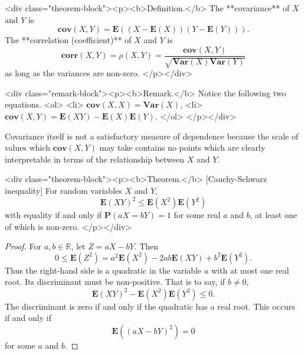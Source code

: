 <div class="theorem-block"><p><b>Definition.</b> 
The **covariance** of $X$ and $Y$ is
$$\begin{equation}
    \mathbf{cov}(X,Y) = \mathbf{E}\left( (X-\mathbf{E}(X))(Y-\mathbf{E}(Y)) \right).
\end{equation}$$
The **correlation (coefficient)** of $X$ and $Y$ is 
$$\begin{equation}
\mathbf{corr}(X, Y) = \rho(X,Y) = \frac{\mathbf{cov}(X,Y)}{\sqrt{\mathbf{Var}(X)\mathbf{Var}(Y)}}
\end{equation}$$
as long as the variances are non-zero. 
</p></div>

<div class="remark-block"><p><b>Remark.</b> 
Notice the following two equations.
<ol>
    <li> $\mathbf{cov}(X,X) = \mathbf{Var}(X)$,
    <li> $\mathbf{cov}(X,Y) = \mathbf{E}(XY) - \mathbf{E}(X)\mathbf{E}(Y)$.
</ol>
</p></div>

Covariance itself is not a satisfactory measure of dependence because the scale of values which $\mathbf{cov}(X, Y)$ may take contains no points which are clearly interpretable in terms of the relationship between $X$ and $Y$.

<div class="theorem-block"><p><b>Theorem.</b> [Cauchy-Schwarz inequality] For random variables $X$ and $Y$, 
$$\begin{equation}
    \mathbf{E}(XY)^2 \leq \mathbf{E}(X^2) \mathbf{E}(Y^2)
\end{equation}$$ 
with equality if and only if $\mathbf{P}(aX = bY) = 1$ for some real $a$ and $b$, at least one of which is non-zero. 
</p></div>

\begin{proof}
For $a, b \in \mathbb{R}$, let $Z = aX - bY$. Then 
$$\begin{equation}
    0 \leq \mathbf{E}(Z^2) = a^2 \mathbf{E}(X^2) - 2ab\mathbf{E}(XY) + b^2\mathbf{E}(Y^2).
\end{equation}$$
Thus the right-hand side is a quadratic in the variable $a$ with at most one real root. Its discriminant must be non-positive. That is to say, if $b \neq 0$, 
$$\begin{equation}
    \mathbf{E}(XY)^2 - \mathbf{E}(X^2) \mathbf{E}(Y^2) \leq 0. 
\end{equation}$$
The discriminant is zero if and only if the quadratic has a real root. This occurs if and only if 
$$\begin{equation}
    \mathbf{E}\left( (aX-bY)^2 \right) = 0
\end{equation}$$
for some $a$ and $b$.
\end{proof}

